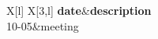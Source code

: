 \begin{table}[htpb]%
\centering%
\caption{外观检测}%
\label{tbl:inspect}%
\begin{tabu}{X[l] X[3,l]}%
\textbf{date}&\textbf{description}\\%
10{-}05&meeting\\%
\end{tabu}%
\end{table}
